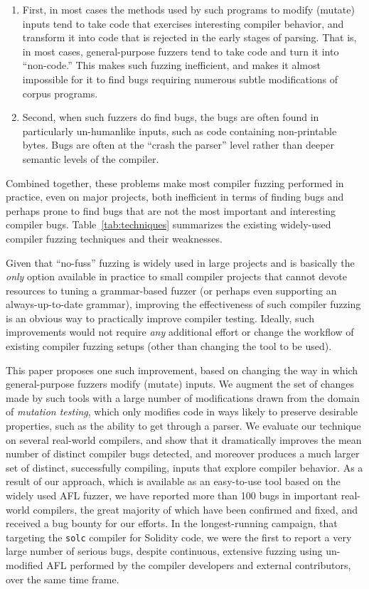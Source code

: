 \begin{enumerate}
\item First, in most cases the methods used by such programs to modify
  (mutate) inputs tend to take code that exercises interesting
  compiler behavior, and transform it into code that is rejected in
  the early stages of parsing.  That is, in most cases,
  general-purpose fuzzers tend to take code and turn it into
  ``non-code.''  This makes such fuzzing inefficient, and makes it
  almost impossible for it to find bugs requiring numerous subtle
  modifications of corpus programs.
  \item Second, when such fuzzers do find bugs, the bugs are often
    found in particularly un-humanlike inputs, such as code
    containing non-printable bytes.  Bugs are often at the ``crash the
    parser'' level rather than deeper semantic levels of the compiler.
  \end{enumerate}

  Combined together, these problems make most compiler fuzzing
  performed in practice, even on major projects, both inefficient in
  terms of finding bugs and perhaps prone to find bugs that are not
  the most important and interesting compiler bugs.
  Table~\ref{tab:techniques} summarizes the existing widely-used
  compiler fuzzing techniques and their weaknesses.

  Given that ``no-fuss'' fuzzing is widely used in large projects and
  is basically the \emph{only} option available in
  practice to small compiler projects that cannot devote resources to
  tuning a grammar-based fuzzer (or perhaps even supporting an
  always-up-to-date grammar), improving the effectiveness of such
  compiler fuzzing is an obvious way to practically improve compiler
  testing.  Ideally, such improvements would not require \emph{any}
  additional effort or change the workflow of existing compiler
  fuzzing setups (other than changing the  tool to be used).

  This paper proposes one such improvement, based on changing the way
  in which general-purpose fuzzers modify (mutate) inputs.  We augment
  the set of changes made by such tools with a large number of
  modifications drawn from the domain of \emph{mutation testing},
  which only modifies code in ways likely to preserve desirable
  properties, such as the ability to get through a parser.  We evaluate
  our technique on several real-world compilers, and show that it
  dramatically improves the mean number of distinct compiler bugs
  detected, and moreover produces a much larger set of distinct,
  successfully compiling, inputs that explore compiler behavior.  As a
  result of our approach, which is available as an easy-to-use tool
  based on the widely used AFL fuzzer, we have reported more than 100
  bugs in important real-world compilers, the great majority of
  which have been confirmed and fixed, and received a bug bounty for
  our efforts.  In the longest-running campaign, that targeting the
  {\tt solc} compiler for Solidity code, we were the first to
  report a very large number of serious bugs, despite continuous, extensive
  fuzzing using un-modified AFL performed by the compiler developers
  and external contributors, over the same time frame.
